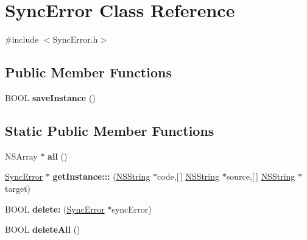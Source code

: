 \hypertarget{interface_sync_error}{
\section{\-Sync\-Error \-Class \-Reference}
\label{interface_sync_error}
}


{\ttfamily \#include $<$\-Sync\-Error.\-h$>$}

\subsection*{\-Public \-Member \-Functions}
\begin{DoxyCompactItemize}
\item 
\hypertarget{interface_sync_error_a18a2a094cabebb608f72098130f277d5}{
\-B\-O\-O\-L {\bfseries save\-Instance} ()}
\label{interface_sync_error_a18a2a094cabebb608f72098130f277d5}

\end{DoxyCompactItemize}
\subsection*{\-Static \-Public \-Member \-Functions}
\begin{DoxyCompactItemize}
\item 
\hypertarget{interface_sync_error_a48b5cfa4542126a7f7edcf177c54203b}{
\-N\-S\-Array $\ast$ {\bfseries all} ()}
\label{interface_sync_error_a48b5cfa4542126a7f7edcf177c54203b}

\item 
\hypertarget{interface_sync_error_aef9cd2051983d49fca8e2836d12298ce}{
\hyperlink{interface_sync_error}{\-Sync\-Error} $\ast$ {\bfseries get\-Instance\-:::} (\hyperlink{class_n_s_string}{\-N\-S\-String} $\ast$code,\mbox{[}$\,$\mbox{]} \hyperlink{class_n_s_string}{\-N\-S\-String} $\ast$source,\mbox{[}$\,$\mbox{]} \hyperlink{class_n_s_string}{\-N\-S\-String} $\ast$target)}
\label{interface_sync_error_aef9cd2051983d49fca8e2836d12298ce}

\item 
\hypertarget{interface_sync_error_a729186c1909269fba998ca3aa69802f0}{
\-B\-O\-O\-L {\bfseries delete\-:} (\hyperlink{interface_sync_error}{\-Sync\-Error} $\ast$sync\-Error)}
\label{interface_sync_error_a729186c1909269fba998ca3aa69802f0}

\item 
\hypertarget{interface_sync_error_a50f982f5294f04bfcecbac4f6740da29}{
\-B\-O\-O\-L {\bfseries delete\-All} ()}
\label{interface_sync_error_a50f982f5294f04bfcecbac4f6740da29}

\end{DoxyCompactItemize}
